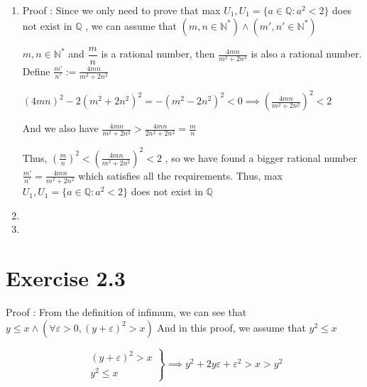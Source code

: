 \documentclass{article}
\begin{document}
\begin{enumerate}
    \item Proof : Since we only need to prove that max $U_1,U_1=\{a\in \mathbb{Q} \colon a^2<2 \}$ does not exist in $\mathbb{Q}$ , we can assume that $ (m,n\in \mathbb{N}^* )\wedge  (m',n'\in \mathbb{N}^* )	$
    
    $m,n\in \mathbb{N}^*$ and $\dfrac{m}{n}$ is a rational number, then $\frac{4 m n}{m^2+2 n^2}$ is also a rational number. Define $\frac{m'}{n'} := \frac{4 m n}{m^2+2 n^2}$
    
    $ (4mn)^2-2(m^2+2n^2)^2=-(m^2-2n^2)^2<0 \implies
   ( \frac{4 m n}{m^2+2 n^2})^2<2		$ 
   
   And we also have 
      $	\frac{4 m n}{m^2+2 n^2}> \frac{4mn}{2n^2+2n^2}=\frac{m}{n}	$
   
   Thus, $ (\frac{m}{n})^2 < (\frac{4 m n}{m^2+2 n^2})^2 < 2 $ , so we have found a bigger rational number $\frac{m'}{n'} = \frac{4 m n}{m^2+2 n^2}$ which satisfies all the requirements. Thus, max $U_1,U_1=\{a\in \mathbb{Q} \colon a^2<2 \}$ does not exist in $\mathbb{Q}$
   
   \item
   
   
   \item
      							

\end{enumerate}


\section{Exercise 2.3}
Proof : 
From the definition of infimum, we can see that $	y\leq x \wedge (\forall \varepsilon >0 ,(y+\varepsilon)^2 >x)	$ And in this proof, we assume that $y^2\leq x$


\[	\left. \begin{gathered}	
 (y+\varepsilon)^2 >x \\
  y^2\leq x
\end{gathered} 	\right \}
\implies y^2+2y\varepsilon +\varepsilon^2>x>y^2	\]
\end{document}
